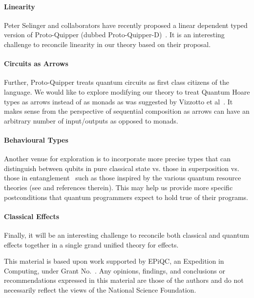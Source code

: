 \documentclass[acmsmall,nonacm,timestamp]{acmart}
\newcommand{\qwire}{\ensuremath{\mathcal{Q}\textsc{wire}}\xspace}
\begin{document}
\paragraph{Linearity} Peter Selinger and collaborators have recently proposed a linear dependent typed version of Proto-Quipper (dubbed Proto-Quipper-D)~\cite{selinger2020}. It is an interesting challenge to reconcile linearity in our theory based on their proposal.

\paragraph{Circuits as Arrows} Further, Proto-Quipper treats quantum circuits as first class citizens of the language. We would like to explore modifying our theory to treat Quantum Hoare types as arrows instead of as monads as was suggested by Vizzotto et al~\cite{so-arrows}. It makes sense from the perspective of sequential composition as arrows can have an arbitrary number of input/outputs as opposed to monads.

\paragraph{Behavioural Types} Another venue for exploration is to incorporate more precise types that can distinguish between qubits in pure classical state vs. those in superposition vs. those in entanglement~\cite{JorrandPerdrix2009} such as those inspired by the various quantum resource theories (see \cite{rand_type_2019} and references therein). This may help us provide more specific postconditions that quantum programmers expect to hold true of their programs.

\paragraph{Classical Effects} Finally, it will be an interesting challenge to reconcile both classical and quantum effects together in a single grand unified theory for effects.


\begin{acks}

	This material is based upon work supported by
	EPiQC, an 
	Expedition in Computing, under Grant
	No.~.  Any opinions, findings, and
	conclusions or recommendations expressed in this material are those
	of the authors and do not necessarily reflect the views of the
	National Science Foundation.
\end{acks}
\end{document}
